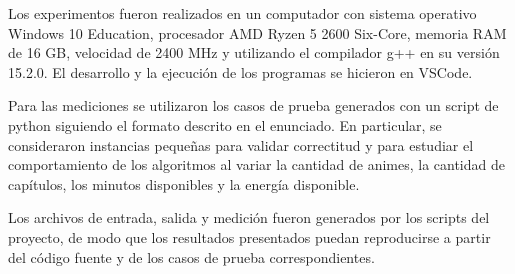 

Los experimentos fueron realizados en un computador con sistema operativo Windows 10 Education, procesador AMD Ryzen 5 2600 Six-Core, memoria RAM de 16 GB, velocidad de 2400 MHz y utilizando el compilador g++ en su versión 15.2.0. El desarrollo y la ejecución de los programas se hicieron en VSCode.

Para las mediciones se utilizaron los casos de prueba generados con un script de python siguiendo el formato descrito en el enunciado. En particular, se consideraron instancias pequeñas para validar correctitud y para estudiar el comportamiento de los algoritmos al variar la cantidad de animes, la cantidad de capítulos, los minutos disponibles y la energía disponible.

Los archivos de entrada, salida y medición fueron generados por los scripts del proyecto, de modo que los resultados presentados puedan reproducirse a partir del código fuente y de los casos de prueba correspondientes.
